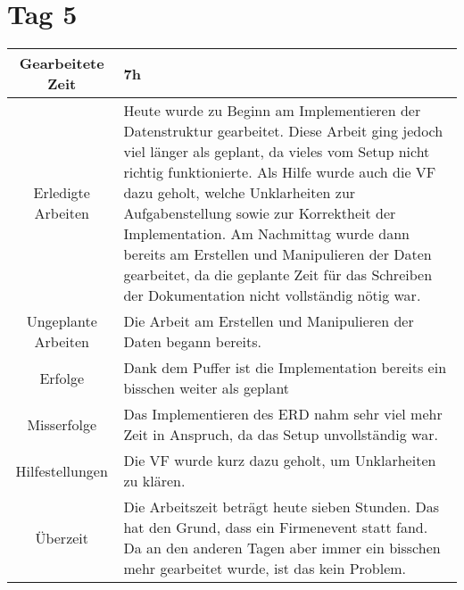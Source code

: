\section{Tag 5}
\begin{tabularx}{\textwidth}[H]{|c|X|}
  \hline
  Gearbeitete Zeit & 7h \\ \hline
  Erledigte Arbeiten & Heute wurde zu Beginn am Implementieren der Datenstruktur gearbeitet. Diese Arbeit ging jedoch
  viel länger als geplant, da vieles vom Setup nicht richtig funktionierte. Als Hilfe wurde auch die VF dazu geholt,
  welche Unklarheiten zur Aufgabenstellung sowie zur Korrektheit der Implementation. \newline
  Am Nachmittag wurde dann bereits am Erstellen und Manipulieren der Daten gearbeitet, da die geplante Zeit für das 
  Schreiben der Dokumentation nicht vollständig nötig war. \\ \hline
  Ungeplante Arbeiten & Die Arbeit am Erstellen und Manipulieren der Daten begann bereits. \\ \hline
  Erfolge & Dank dem Puffer ist die Implementation bereits ein bisschen weiter als geplant \\ \hline
  Misserfolge & Das Implementieren des ERD nahm sehr viel mehr Zeit in Anspruch, da das Setup unvollständig war. \\ \hline
  Hilfestellungen & Die VF wurde kurz dazu geholt, um Unklarheiten zu klären. \\ \hline
  Überzeit & Die Arbeitszeit beträgt heute sieben Stunden. Das hat den Grund, dass ein Firmenevent statt fand.
  Da an den anderen Tagen aber immer ein bisschen mehr gearbeitet wurde, ist das kein Problem. \\ \hline
\end{tabularx}

\newpage

